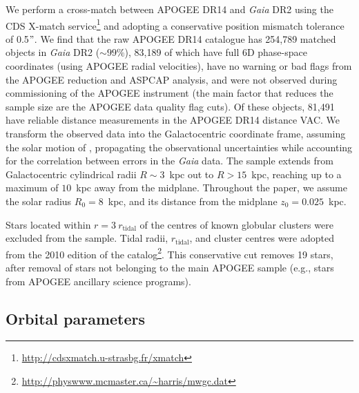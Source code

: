 We perform a cross-match between APOGEE DR14 and \emph{Gaia} DR2
using the CDS X-match
service\footnote{\url{http://cdsxmatch.u-strasbg.fr/xmatch}} and
adopting a conservative position mismatch tolerance of 0.5$"$.  We
find that the raw APOGEE DR14 catalogue has 254,789 matched objects
in \emph{Gaia} DR2 ($\sim 99\%$), 83,189 of which have full 6D phase-space coordinates (using APOGEE radial velocities),
have no warning or bad flags from the APOGEE reduction and ASPCAP
analysis, and were not observed during commissioning of the APOGEE
instrument (the main factor that reduces the sample size are the APOGEE data quality flag cuts).  Of these objects, 81,491 have reliable distance
measurements in the APOGEE DR14 distance VAC.  We transform the
observed data into the Galactocentric coordinate frame, assuming
the solar motion of \citet{2010MNRAS.403.1829S}, propagating the
observational uncertainties while accounting for the correlation between
errors in the \emph{Gaia} data. The sample extends from Galactocentric cylindrical radii $R \sim
3$~kpc out to $ R > 15$~kpc, reaching up to a maximum of
$10$~kpc away from the midplane. Throughout the paper, we
assume the solar radius $R_0 = 8$~kpc, and its distance from the
midplane $z_0 = 0.025$~kpc.

Stars located within $r = 3\ r_{\mathrm{tidal}}$ of the centres of
known globular clusters were
excluded from the sample.  Tidal radii, $r_\mathrm{tidal}$, and
cluster centres were adopted from the 2010 edition of the
\citet{1996AJ....112.1487H}
catalog\footnote{\url{http://physwww.mcmaster.ca/~harris/mwgc.dat}}.
This conservative cut removes 19 stars, after removal of stars not belonging to the main APOGEE sample
(e.g., stars from APOGEE ancillary science programs). 

\subsection{Orbital parameters}

